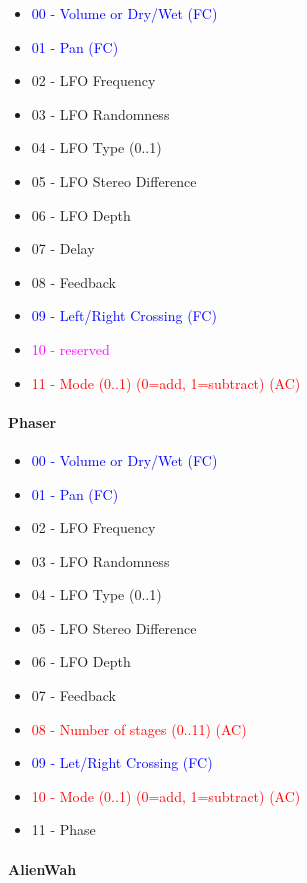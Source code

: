    \begin{itemize}
      \item \textcolor{blue}{00 - Volume or Dry/Wet (FC)}
      \item \textcolor{blue}{01 - Pan (FC)}
      \item 02 - LFO Frequency
      \item 03 - LFO Randomness
      \item 04 - LFO Type (0..1)
      \item 05 - LFO Stereo Difference
      \item 06 - LFO Depth
      \item 07 - Delay
      \item 08 - Feedback
      \item \textcolor{blue}{09 - Left/Right Crossing (FC)}
      \item \textcolor{magenta}{10 - reserved}
      \item \textcolor{red}{11 - Mode (0..1) (0=add, 1=subtract) (AC)}
   \end{itemize}

\paragraph{Phaser}

   \begin{itemize}
      \item \textcolor{blue}{00 - Volume or Dry/Wet (FC)}
      \item \textcolor{blue}{01 - Pan (FC)}
      \item 02 - LFO Frequency
      \item 03 - LFO Randomness
      \item 04 - LFO Type (0..1)
      \item 05 - LFO Stereo Difference
      \item 06 - LFO Depth
      \item 07 - Feedback
      \item \textcolor{red}{08 - Number of stages (0..11) (AC)}
      \item \textcolor{blue}{09 - Let/Right Crossing (FC)}
      \item \textcolor{red}{10 - Mode (0..1) (0=add, 1=subtract) (AC)}
      \item 11 - Phase
   \end{itemize}

\paragraph{AlienWah}

